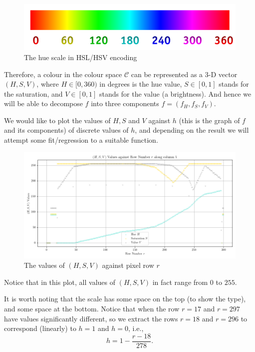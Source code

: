 \documentclass[10pt]{article}
\begin{document}
\begin{figure}[!ht]
    \centering
    \includegraphics[scale = 0.15]{hue-scale.png}
    \caption{The hue scale in HSL/HSV encoding}
    \label{fig:hue-scale}
\end{figure}

Therefore, a colour in the colour space \(\mathcal{C}\) can be represented as a 3-D vector \((H, S, V)\), where \(H \in [0, 360)\) in degrees is the hue value, \(S \in [0, 1]\) stands for the saturation, and \(V \in [0, 1]\) stands for the value (a brightness). And hence we will be able to decompose \(f\) into three components \(f = \left(f_H, f_S, f_V\right)\).

We would like to plot the values of \(H, S\) and \(V\) against \(h\) (this is the graph of \(f\) and its components) of discrete values of \(h\), and depending on the result we will attempt some fit/regression to a suitable function.

\begin{figure}[!ht]
    \centering
    \includegraphics[scale = 0.55]{hsv-against-row.png}
    \caption{The values of \((H, S, V)\) against pixel row \(r\)}
    \label{fig:hsv-against-row}
\end{figure}

Notice that in this plot, all values of \((H, S, V)\) in fact range from \(0\) to \(255\).

It is worth noting that the scale has some space on the top (to show the type), and some space at the bottom. Notice that when the row \(r = 17\) and \(r = 297\) have values significantly different, so we extract the rows \(r = 18\) and \(r = 296\) to correspond (linearly) to \(h = 1\) and \(h = 0\), i.e.,
\[
    h = 1 - \frac{r - 18}{278}.
\]
\end{document}
